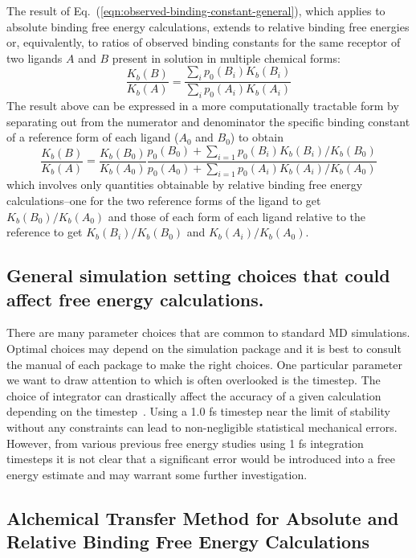 \documentclass[9pt,bestpractices]{livecoms}
\begin{document}
The result of Eq.~(\ref{eqn:observed-binding-constant-general}), which applies to absolute binding free energy calculations, extends to relative binding free energies or, equivalently, to ratios of observed binding constants for the same receptor of two ligands $A$ and $B$ present in solution in multiple chemical forms:
\begin{equation}
  \frac{K_b(B)}{K_b(A)} = \frac{\sum_i p_0(B_i) K_b(B_i)}{\sum_i p_0(A_i) K_b(A_i)}
  \label{eqn:observed-binding-constant-ratio}
\end{equation}
The result above can be expressed in a more computationally tractable form by separating out from the numerator and denominator the specific binding constant of a reference form of each ligand ($A_0$ and $B_0$) to obtain\cite{de2018rigorous}
\begin{equation}
 \frac{K_b(B)}{K_b(A)} = \frac{K_b(B_0)}{K_b(A_0)} \frac{
 p_0(B_0) + \sum_{i=1} p_0(B_i) K_b(B_i)/K_b(B_0)
 }{
p_0(A_0) + \sum_{i=1} p_0(A_i) K_b(A_i)/K_b(A_0)
 }
\end{equation}
which involves only quantities obtainable by relative binding free energy calculations--one for the two reference forms of the ligand to get  $K_b(B_0)/K_b(A_0)$ and those of each form of each ligand relative to the reference to get $K_b(B_i)/K_b(B_0)$ and $K_b(A_i)/K_b(A_0)$.

\subsection{General simulation setting choices that could affect free energy calculations.}
There are many parameter choices that are common to standard MD simulations. Optimal choices may depend on the simulation package and it is best to consult the manual of each package to make the right choices. One particular parameter we want to draw attention to which is often overlooked is the timestep. The choice of integrator can drastically affect the accuracy of a given calculation depending on the timestep~\cite{leimkuhler2016efficient}. Using a 1.0 fs timestep near the limit of stability without any constraints can lead to non-negligible statistical mechanical errors. However, from various previous free energy studies using 1 fs integration timesteps it is not clear that a significant error would be introduced into a free energy estimate and may warrant some further investigation.  

\subsection{Alchemical Transfer Method for Absolute and Relative Binding Free Energy Calculations}
\end{document}
